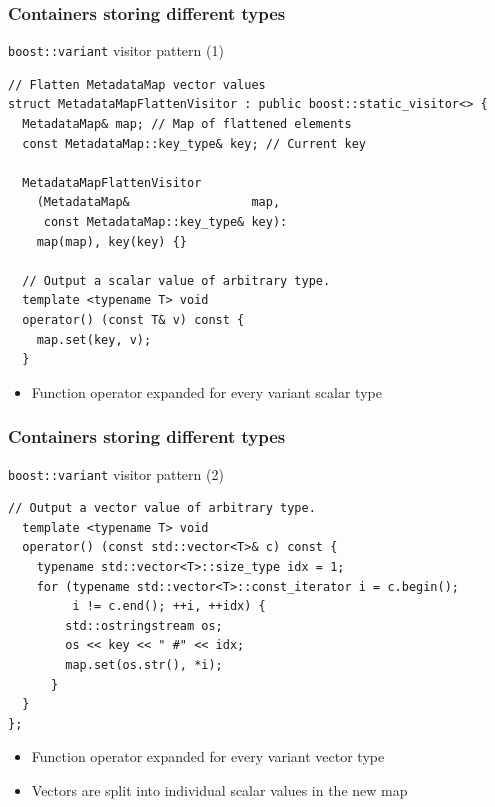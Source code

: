 \documentclass[handout]{beamer}
\begin{document}
\begin{frame}[fragile]
  \frametitle{Containers storing different types}
  \begin{block}{\texttt{boost::variant} visitor pattern (1)}
    \footnotesize
    \begin{lstlisting}[basicstyle=\scriptsize\ttfamily,frame=tlr]
// Flatten MetadataMap vector values
struct MetadataMapFlattenVisitor : public boost::static_visitor<> {
  MetadataMap& map; // Map of flattened elements
  const MetadataMap::key_type& key; // Current key

  MetadataMapFlattenVisitor
    (MetadataMap&                 map,
     const MetadataMap::key_type& key):
    map(map), key(key) {}

  // Output a scalar value of arbitrary type.
  template <typename T> void
  operator() (const T& v) const {
    map.set(key, v);
  }
\end{lstlisting}
  \begin{itemize}
    \pause
  \item Function operator expanded for every variant scalar type
  \end{itemize}
  \end{block}
\end{frame}

\begin{frame}[fragile]
  \frametitle{Containers storing different types}
  \begin{block}{\texttt{boost::variant} visitor pattern (2)}
    \scriptsize
    \begin{lstlisting}[frame=blr]
  // Output a vector value of arbitrary type.
  template <typename T> void
  operator() (const std::vector<T>& c) const {
    typename std::vector<T>::size_type idx = 1;
    for (typename std::vector<T>::const_iterator i = c.begin();
         i != c.end(); ++i, ++idx) {
        std::ostringstream os;
        os << key << " #" << idx;
        map.set(os.str(), *i);
      }
  }
};
\end{lstlisting}
  \begin{itemize}
    \pause
  \item Function operator expanded for every variant vector type
  \item Vectors are split into individual scalar values in the new map
  \end{itemize}
  \end{block}
\end{frame}
\end{document}

